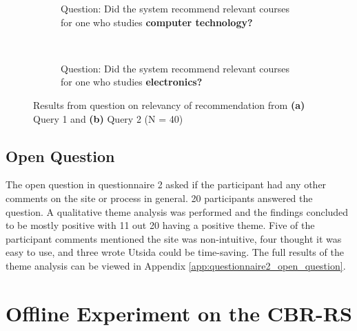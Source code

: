 \begin{figure}[h]
    \centering
    \begin{subfigure}[b]{0.4\textwidth}
        
        \caption{Question: Did the system recommend relevant courses for one who studies \textbf{computer technology?}}
        \label{fig:predesigned_2_p1}
    \end{subfigure}
    ~ \qquad %
    \begin{subfigure}[b]{0.4\textwidth}
       
        \caption{Question: Did the system recommend relevant courses for one who studies \textbf{electronics?}}
        \label{fig:predesigned_2_p2}
    \end{subfigure}
    \caption[Result for relevancy of pre-defined recommendation]{Results from question on relevancy of recommendation from \textbf{(a)} Query 1 and \textbf{(b)} Query 2 (N = 40)}
    \label{fig:predesigned_2}
\end{figure}


\FloatBarrier

\subsection{Open Question}

The open question in questionnaire 2 asked if the participant had any other comments on the site or process in general. 20 participants answered the question. A qualitative theme analysis \cite{oates2005researching} was performed and the findings concluded to be mostly positive with 11 out 20 having a positive theme. Five of the participant comments mentioned the site was non-intuitive, four thought it was easy to use, and three wrote Utsida could be time-saving. The full results of the theme analysis can be viewed in Appendix \ref{app:questionnaire2_open_question}.

\FloatBarrier
\section{Offline Experiment on the CBR-RS}

